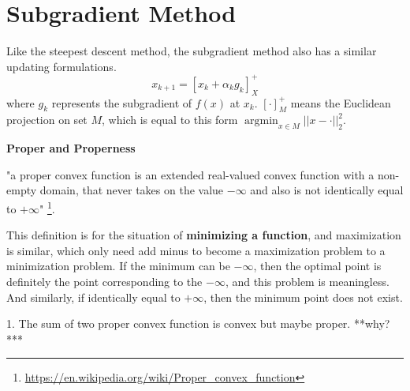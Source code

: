 	\section{Subgradient Method}
	
	Like the steepest descent method, the subgradient method also has a similar updating formulations.
	$$
	x_{k+1} = [x_k + \alpha_kg_k]^{+}_{X}
	$$
	where $g_k$ represents the subgradient of $f(x)$ at $x_k$. $[\cdot]^{+}_M$ means the Euclidean projection on set $M$, which is equal to this form $\mathop{\arg\min}_{x\in M} ||x-\cdot||_2^2$.
	
	\begin{Notes}{\textbf{Proper and Properness}}{}
		\begin{defn}{}{}
			"a proper convex function is an extended real-valued convex function with a non-empty domain, that never takes on the value $-\infty$  and also is not identically equal to $+\infty$" \footnote{\url{https://en.wikipedia.org/wiki/Proper_convex_function}}.
		\end{defn} 
		This definition is for the situation of \textbf{minimizing a function}, and maximization is similar, which only need add minus to become a maximization problem to a minimization problem. 
		If the minimum can be $-\infty$, then the optimal point is definitely the point corresponding to the $-\infty$, and this problem is meaningless. And similarly, if identically equal to $+\infty$, then the minimum point does not exist.
		\begin{Properties}{}{}
		 1. The sum of two proper convex function is convex but maybe proper. **why?***
		\end{Properties}
	\end{Notes}

